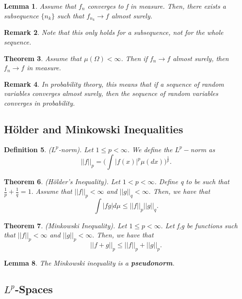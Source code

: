 \documentclass[twoside]{article}
\newcounter{lecnum}
\newtheorem{theorem}{Theorem}[lecnum]
\newtheorem{lemma}[theorem]{Lemma}
\newtheorem{definition}[theorem]{Definition}
\newtheorem{remark}[theorem]{Remark}
\begin{document}
\begin{lemma}Assume that $f_n$ converges to f in measure. Then, there exists a subsequence $\{n_k\}$ such that $f_{n_{k}} \rightarrow f$ almost surely.
\end{lemma}

\begin{remark}Note that this only holds for a subsequence, not for the whole sequence.
\end{remark}

\begin{theorem}Assume that $\mu(\Omega) < \infty$. Then if $f_n \rightarrow f$ almost surely, then $f_n \rightarrow f$ in measure.
\end{theorem}

\begin{remark}In probability theory, this means that if a sequence of random variables converges almost surely, then the sequence of random variables converges in probability.
\end{remark}

\subsection{Hölder and Minkowski Inequalities}

\begin{definition}($L^p$-norm). Let $1 \leq p < \infty$. We define the $L^p-$norm as 
$$
||f||_p = \bigg(\int |f(x)|^p\mu (dx) \bigg)^{\frac{1}{p}}.
$$
\end{definition}

\begin{theorem}(Hölder's Inequality). Let $1 < p < \infty$. Define q to be such that $\frac{1}{p} + \frac{1}{q} = 1.$ Assume that $||f||_p < \infty$ and $||g||_q < \infty.$ Then, we have that 
$$
\int |fg|d\mu \leq ||f||_p||g||_q.
$$
\end{theorem}


\begin{theorem}(Minkowski Inequality). Let $1 \leq p < \infty.$ Let f,g be functions such that $||f||_p < \infty$ and $||g||_p < \infty.$ Then, we have that 
$$
||f + g||_p \leq ||f||_p + ||g||_p.
$$
\end{theorem}

\begin{lemma}The Minkowski inequality is a \textbf{pseudonorm}.
\end{lemma}

\subsection{$L^p$-Spaces}
\end{document}
